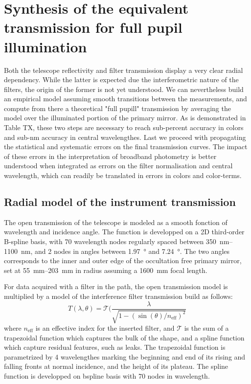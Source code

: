 \section{Synthesis of the equivalent transmission for full pupil illumination}
\label{sec:discussion}

Both the telescope reflectivity and filter transmission display a very
clear radial dependency. While the latter is expected due the
interferometric nature of the filters, the origin of the former is not
yet understood. We can nevertheless build an empirical model assuming
smooth transitions between the measurements, and compute from there a
theoretical "full pupill" transmission by averaging the model over the
illuminated portion of the primary mirror. As is demonstrated in Table
TX, these two steps are necessary to reach sub-percent accuracy in
colors and sub-nm accuracy in central wavelengthes. Last we proceed
with propagating the statistical and systematic errors on the final
transmission curves. The impact of these errors in the interpretation
of broadband photometry is better understood when integrated as errors
on the filter normalisation and central wavelength, which can readily
be translated in errors in colors and color-terms.


\subsection{Radial model of the instrument transmission}
\label{sec:model}

The open transmission of the telescope is modeled as a smooth fonction
of wavelength and incidence angle. The function is developped on a 2D
third-order B-spline basis, with 70 wavelength nodes regularly spaced
between \SIrange{350}{1100}{nm}, and 2 nodes in angles between
\SI{1.97}{\degree} and \SI{7.24}{\degree}. The two angles corresponds to
the inner and outer edge of the occultation free primary mirror, set
at \SIrange{55}{203}{mm} in radius assuming a \SI{1600}{mm} focal
length.

For data acquired with a filter in the path, the open transmission
model is multiplied by a model of the interference filter transmission
build as follows:
\begin{equation}
  \label{eq:filtertransmission}
T(\lambda, \theta) = \mathcal T(\frac{\lambda}{\sqrt{1 -
    (\sin(\theta) / n_\text{eff})^2}}
\end{equation}
where $n_\text{eff}$ is an effective index for the inserted filter,
and $\mathcal T$ is the sum of a trapezoidal function which captures
the bulk of the shape, and a spline function which capture residual
features, such as leaks. The trapezoidal function is parametrized by 4
wavelengthes marking the beginning and end of its rising and falling
fronts at normal incidence, and the height of its plateau. The spline
function is developped on bspline basis with 70 nodes in wavelength.

